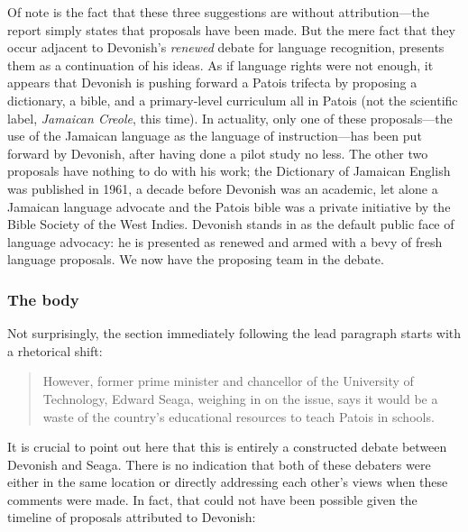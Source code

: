\documentclass[output=paper,colorlinks,citecolor=brown]{langscibook}
\begin{document}
Of note is the fact that these three suggestions are without attribution—the report simply states that proposals have been made. But the mere fact that they occur adjacent to Devonish’s \emph{renewed} debate for language recognition, presents them as a continuation of his ideas. As if language rights were not enough, it appears that Devonish is pushing forward a Patois trifecta by proposing a dictionary, a bible, and a primary-level curriculum all in Patois (not the scientific label, \emph{Jamaican Creole}, this time). In actuality, only one of these proposals—the use of the Jamaican language as the language of instruction—has been put forward by Devonish, after having done a pilot study no less. The other two proposals have nothing to do with his work; the Dictionary of Jamaican English was published in 1961, a decade before Devonish was an academic, let alone a Jamaican language advocate and the Patois bible was a private initiative by the Bible Society of the West Indies. Devonish stands in as the default public face of language advocacy: he is presented as renewed and armed with a bevy of fresh language proposals. We now have the proposing team in the debate.

\subsubsection{The body}

Not surprisingly, the section immediately following the lead paragraph starts with a rhetorical shift: 

\begin{quote}
    However, former prime minister and chancellor of the University of Technology, Edward Seaga, weighing in on the issue, says it would be a waste of the country’s educational resources to teach Patois in schools.
\end{quote}

It is crucial to point out here that this is entirely a constructed debate between Devonish and Seaga. There is no indication that both of these debaters were either in the same location or directly addressing each other’s views when these comments were made. In fact, that could not have been possible given the timeline of proposals attributed to Devonish:
\end{document}
